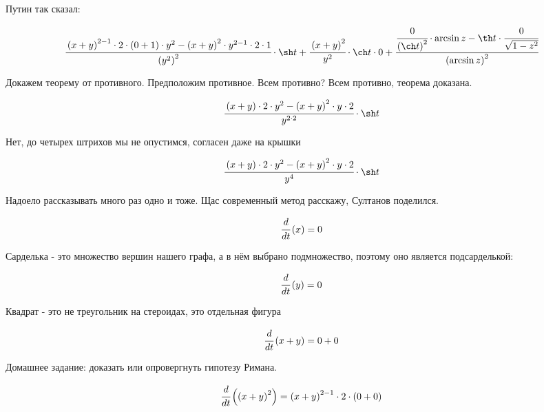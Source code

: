 Путин так сказал:


\begin{dmath}
\cfrac{\left(x + y\right)^{2 - 1} \cdot 2 \cdot \left(0 + 1\right) \cdot y^{2} - \left(x + y\right)^{2} \cdot y^{2 - 1} \cdot 2 \cdot 1}{\left(y^{2}\right)^{2}} \cdot \sh t + \cfrac{\left(x + y\right)^{2}}{y^{2}} \cdot \ch t \cdot 0 + \cfrac{\cfrac{0}{\left(\ch t\right)^{2}} \cdot \arcsin z - \th t \cdot \cfrac{0}{\sqrt{  1 - z^{2}}}}{\left(\arcsin z\right)^{2}}
\end{dmath}


Докажем теорему от противного. Предположим противное. Всем противно? Всем противно, теорема доказана.


\begin{dmath}
\cfrac{\left(x + y\right) \cdot 2 \cdot y^{2} - \left(x + y\right)^{2} \cdot y \cdot 2}{y^{2 \cdot 2}} \cdot \sh t
\end{dmath}


Нет, до четырех штрихов мы не опустимся, согласен даже на крышки


\begin{dmath}
\cfrac{\left(x + y\right) \cdot 2 \cdot y^{2} - \left(x + y\right)^{2} \cdot y \cdot 2}{y^{4}} \cdot \sh t
\end{dmath}


Надоело рассказывать много раз одно и тоже. Щас современный метод расскажу, Султанов поделился.


\begin{dmath}
 \cfrac{d}{d t} \left( x \right) = 0 
\end{dmath}


Сарделька - это множество вершин нашего графа, а в нём выбрано подмножество, поэтому оно является подсарделькой:


\begin{dmath}
 \cfrac{d}{d t} \left( y \right) = 0 
\end{dmath}


Квадрат - это не треугольник на стероидах, это отдельная фигура


\begin{dmath}
 \cfrac{d}{d t} \left( x + y \right) = 0 + 0 
\end{dmath}


Домашнее задание: доказать или опровергнуть гипотезу Римана.


\begin{dmath}
 \cfrac{d}{d t} \left( \left(x + y\right)^{2} \right) = \left(x + y\right)^{2 - 1} \cdot 2 \cdot \left(0 + 0\right) 
\end{dmath}


